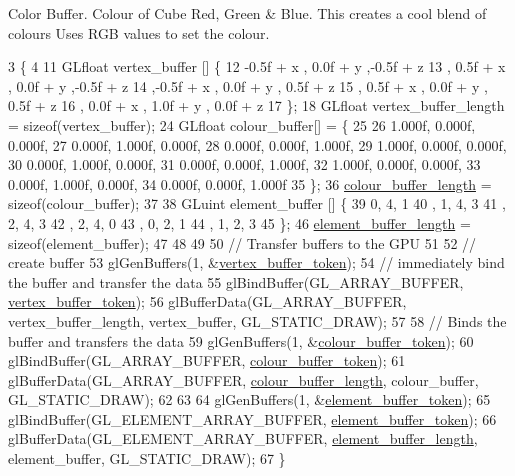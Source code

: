 Color Buffer. Colour of Cube Red, Green \& Blue. This creates a cool blend of colours Uses R\+G\+B values to set the colour.
\begin{DoxyCode}
3                                                           \{
4 
11   GLfloat vertex\_buffer [] \{
12       -0.5f + x  , 0.0f + y   ,-0.5f + z
13      , 0.5f + x  , 0.0f + y   ,-0.5f + z
14      ,-0.5f + x  , 0.0f + y   , 0.5f + z
15      , 0.5f + x  , 0.0f + y   , 0.5f + z
16      , 0.0f + x  , 1.0f + y   , 0.0f + z
17   \};
18   GLfloat vertex\_buffer\_length = \textcolor{keyword}{sizeof}(vertex\_buffer);
24   GLfloat colour\_buffer[] = \{
25 
26      1.000f, 0.000f, 0.000f,
27      0.000f, 1.000f, 0.000f,
28      0.000f, 0.000f, 1.000f,
29      1.000f, 0.000f, 0.000f,
30      0.000f, 1.000f, 0.000f,
31      0.000f, 0.000f, 1.000f,
32      1.000f, 0.000f, 0.000f,
33      0.000f, 1.000f, 0.000f,
34      0.000f, 0.000f, 1.000f
35   \};
36  \hyperlink{classPyramidAsset_addd87a747d7bd186bd1b3e3070185c69}{colour\_buffer\_length} = \textcolor{keyword}{sizeof}(colour\_buffer);
37   
38   GLuint element\_buffer []  \{
39       0, 4, 1   
40     , 1, 4, 3
41     , 2, 4, 3   
42     , 2, 4, 0
43     , 0, 2, 1
44     , 1, 2, 3
45   \};
46   \hyperlink{classPyramidAsset_a5566105859271b493eab3b5f9c02f866}{element\_buffer\_length} = \textcolor{keyword}{sizeof}(element\_buffer);
47 
48 
49 
50   \textcolor{comment}{// Transfer buffers to the GPU}
51 
52   \textcolor{comment}{// create buffer}
53   glGenBuffers(1, &\hyperlink{classPyramidAsset_a54d9cec42bc77d07a66e6c1cd55049b0}{vertex\_buffer\_token});
54   \textcolor{comment}{// immediately bind the buffer and transfer the data}
55   glBindBuffer(GL\_ARRAY\_BUFFER, \hyperlink{classPyramidAsset_a54d9cec42bc77d07a66e6c1cd55049b0}{vertex\_buffer\_token});
56   glBufferData(GL\_ARRAY\_BUFFER, vertex\_buffer\_length, vertex\_buffer, GL\_STATIC\_DRAW);
57 
58   \textcolor{comment}{// Binds the buffer and transfers the data}
59   glGenBuffers(1, &\hyperlink{classPyramidAsset_a1c82b429f52d92feefacb5755017aec0}{colour\_buffer\_token});
60   glBindBuffer(GL\_ARRAY\_BUFFER, \hyperlink{classPyramidAsset_a1c82b429f52d92feefacb5755017aec0}{colour\_buffer\_token});
61   glBufferData(GL\_ARRAY\_BUFFER, \hyperlink{classPyramidAsset_addd87a747d7bd186bd1b3e3070185c69}{colour\_buffer\_length}, colour\_buffer, GL\_STATIC\_DRAW);
62 
63 
64   glGenBuffers(1, &\hyperlink{classPyramidAsset_a6f7e2f50904d2941e33df8eb7f5f9c2d}{element\_buffer\_token});
65   glBindBuffer(GL\_ELEMENT\_ARRAY\_BUFFER, \hyperlink{classPyramidAsset_a6f7e2f50904d2941e33df8eb7f5f9c2d}{element\_buffer\_token});
66   glBufferData(GL\_ELEMENT\_ARRAY\_BUFFER, \hyperlink{classPyramidAsset_a5566105859271b493eab3b5f9c02f866}{element\_buffer\_length}, element\_buffer, 
      GL\_STATIC\_DRAW);
67 \}
\end{DoxyCode}
\hypertarget{classPyramidAsset_afb388a196f43a3808b2d4f6fdb89ee84}{}
